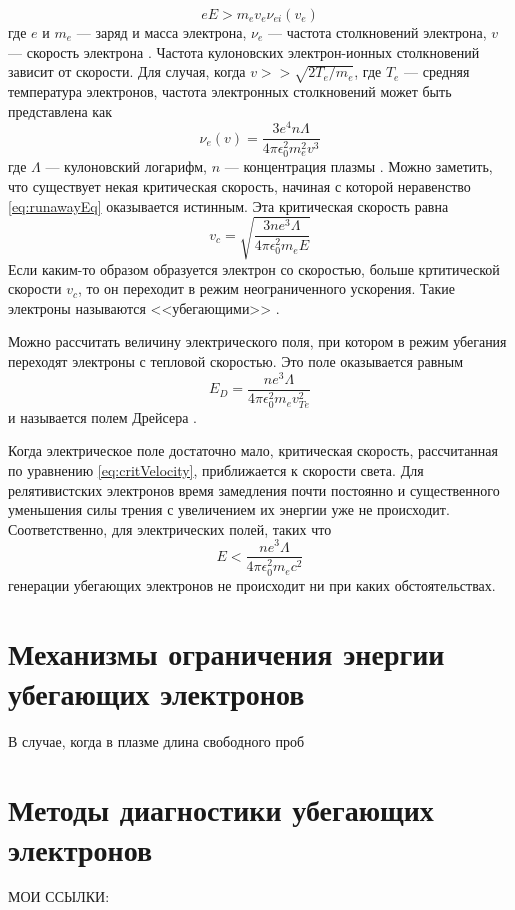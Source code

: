 \begin{equation}
  \label{eq:runawayEq}
  e E >  m_e v_e \nu_{ei}(v_e)
\end{equation}
где $e$ и $m_e$ --- заряд и масса электрона, $\nu_{e}$ --- частота столкновений электрона, $v$ --- скорость электрона \cite{Wesson2004}. Частота кулоновских электрон-ионных столкновений зависит от скорости. Для случая, когда $v >> \sqrt{ 2 T_e / m_e }$, где $T_e$ --- средняя температура электронов, частота электронных столкновений может быть представлена как 
\begin{equation}
  \nu_{e}(v) = \frac{ 3 e^4 n \Lambda }{ 4 \pi \epsilon_0^2 m_e^2 v^3 }
\end{equation} 
где $\Lambda$ --- кулоновский логарифм, $n$ --- концентрация плазмы \cite{Wesson2004}. Можно заметить, что существует некая критическая скорость, начиная с которой неравенство \ref{eq:runawayEq} оказывается истинным. Эта критическая скорость равна
\begin{equation}
  \label{eq:critVelocity}
  v_c = \sqrt{ \frac{ 3 n e^3 \Lambda }{ 4 \pi \epsilon_0^2 m_e E } }
\end{equation}
Если каким-то образом образуется электрон со скоростью, больше кртитической скорости $v_c$, то он переходит в режим неограниченного ускорения. Такие электроны называются <<убегающими>> \cite{Golant1977}.

Можно рассчитать величину электрического поля, при котором в режим убегания переходят электроны с тепловой скоростью. Это поле оказывается равным 
\begin{equation}
  E_D = \frac{ n e^3 \Lambda }{ 4 \pi \epsilon_0^2 m_e v_{Te}^2 }
\end{equation}
и называется полем Дрейсера \cite{Dreicer1959,Golant1977,Wesson2004}. 

Когда электрическое поле достаточно мало, критическая скорость, рассчитанная по уравнению \ref{eq:critVelocity}, приближается к скорости света. Для релятивистских электронов время замедления почти постоянно и существенного уменьшения силы трения с увеличением их энергии уже не происходит. Соответственно, для электрических полей, таких что
\begin{equation}
  E < \frac{ n e^3 \Lambda }{ 4 \pi \epsilon_0^2 m_e c^2 }
\end{equation}
генерации убегающих электронов не происходит ни при каких обстоятельствах.

\section{Механизмы ограничения энергии убегающих электронов}


В случае, когда в плазме длина свободного проб


\section{Методы диагностики убегающих электронов}\label{sec:ch1/sec2}

МОИ ССЫЛКИ: \cite{Khilkevitch2020} \cite{Reux2015}

\FloatBarrier
